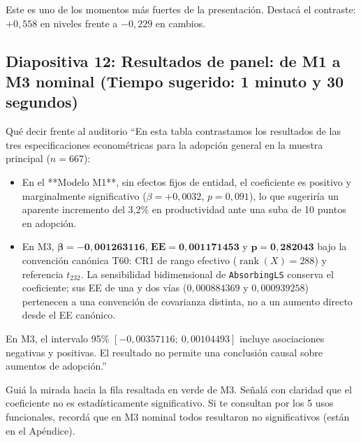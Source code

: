 \documentclass[11pt,a4paper]{article}
\begin{document}
\begin{tipbox}
Este es uno de los momentos más fuertes de la presentación. Destacá el contraste: $+0{,}558$ en niveles frente a $-0{,}229$ en cambios.
\end{tipbox}

\subsection*{Diapositiva 12: Resultados de panel: de M1 a M3 nominal (Tiempo sugerido: 1 minuto y 30 segundos)}

\begin{speechbox}{Qué decir frente al auditorio}
``En esta tabla contrastamos los resultados de las tres especificaciones econométricas para la adopción general en la muestra principal ($n=667$):
\begin{itemize}[itemsep=0.15em]
  \item En el **Modelo M1**, sin efectos fijos de entidad, el coeficiente es positivo y marginalmente significativo ($\beta = +0{,}0032$, $p = 0{,}091$), lo que sugeriría un aparente incremento del 3,2\% en productividad ante una suba de 10 puntos en adopción.
  \item En M3, $\mathbf{\beta=-0{,}001263116}$, $\mathbf{EE=0{,}001171453}$ y $\mathbf{p=0{,}282043}$ bajo la convención canónica T60: CR1 de rango efectivo ($\operatorname{rank}(X)=288$) y referencia $t_{232}$. La sensibilidad bidimensional de \texttt{AbsorbingLS} conserva el coeficiente; sus EE de una y dos vías ($0{,}000884369$ y $0{,}000939258$) pertenecen a una convención de covarianza distinta, no a un aumento directo desde el EE canónico.
\end{itemize}

En M3, el intervalo 95\% $[-0{,}00357116;\ 0{,}00104493]$ incluye asociaciones negativas y positivas. El resultado no permite una conclusión causal sobre aumentos de adopción.''
\end{speechbox}

\begin{tipbox}
Guiá la mirada hacia la fila resaltada en verde de M3. Señalá con claridad que el coeficiente no es estadísticamente significativo. Si te consultan por los 5 usos funcionales, recordá que en M3 nominal todos resultaron no significativos (están en el Apéndice).
\end{tipbox}

\end{document}
